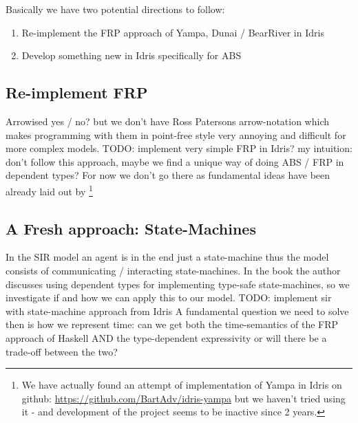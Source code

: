 Basically we have two potential directions to follow:
\begin{enumerate}
	\item Re-implement the FRP approach of Yampa, Dunai / BearRiver in Idris
	\item Develop something new in Idris specifically for ABS
\end{enumerate}

\subsection{Re-implement FRP}
Arrowised yes / no? but we don't have Ross Patersons arrow-notation which makes programming with them in point-free style very annoying and difficult for more complex models.
TODO: implement very simple FRP in Idris?
my intuition: don't follow this approach, maybe we find a unique way of doing ABS / FRP in dependent types? For now we don't go there as fundamental ideas have been already laid out by \cite{sculthorpe_safe_2009} \footnote{We have actually found an attempt of implementation of Yampa in Idris on github: \url{https://github.com/BartAdv/idris-yampa} but we haven't tried using it - and development of the project seems to be inactive since 2 years.}

\subsection{A Fresh approach: State-Machines}
In the SIR model an agent is in the end just a state-machine thus the model consists of communicating / interacting state-machines. In the book \cite{brady_type-driven_2017} the author discusses using dependent types for implementing type-safe state-machines, so we investigate if and how we can apply this to our model.
TODO: implement sir with state-machine approach from Idris
A fundamental question we need to solve then is how we represent time: can we get both the time-semantics of the FRP approach of Haskell AND the type-dependent expressivity or will there be a trade-off between the two?
